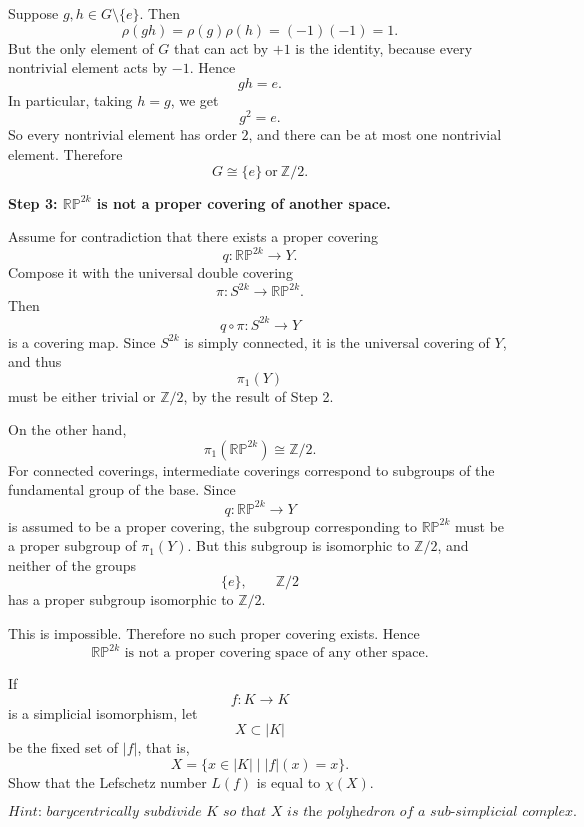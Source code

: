 \begin{solution}
Suppose \(g,h\in G\setminus\{e\}\). Then
\[
\rho(gh)=\rho(g)\rho(h)=(-1)(-1)=1.
\]
But the only element of \(G\) that can act by \(+1\) is the identity, because every nontrivial element acts by \(-1\). Hence
\[
gh=e.
\]
In particular, taking \(h=g\), we get
\[
g^2=e.
\]
So every nontrivial element has order \(2\), and there can be at most one nontrivial element. Therefore
\[
\boxed{G\cong \{e\}\ \text{or}\ \mathbb Z/2.}
\]

\par

\textbf{Step 3: \(\mathbb{RP}^{2k}\) is not a proper covering of another space.}

Assume for contradiction that there exists a proper covering
\[
q:\mathbb{RP}^{2k}\to Y.
\]
Compose it with the universal double covering
\[
\pi:S^{2k}\to \mathbb{RP}^{2k}.
\]
Then
\[
q\circ \pi:S^{2k}\to Y
\]
is a covering map. Since \(S^{2k}\) is simply connected, it is the universal covering of \(Y\), and thus
\[
\pi_1(Y)
\]
must be either trivial or \(\mathbb Z/2\), by the result of Step 2.

On the other hand,
\[
\pi_1(\mathbb{RP}^{2k})\cong \mathbb Z/2.
\]
For connected coverings, intermediate coverings correspond to subgroups of the fundamental group of the base. Since
\[
q:\mathbb{RP}^{2k}\to Y
\]
is assumed to be a proper covering, the subgroup corresponding to \(\mathbb{RP}^{2k}\) must be a proper subgroup of \(\pi_1(Y)\). But this subgroup is isomorphic to \(\mathbb Z/2\), and neither of the groups
\[
\{e\},\qquad \mathbb Z/2
\]
has a proper subgroup isomorphic to \(\mathbb Z/2\).

This is impossible. Therefore no such proper covering exists. Hence
\[
\boxed{\mathbb{RP}^{2k}\text{ is not a proper covering space of any other space.}}
\]
\end{solution}

\begin{problem}
If
\[
f:K\to K
\]
is a simplicial isomorphism, let
\[
X\subset |K|
\]
be the fixed set of \(|f|\), that is,
\[
X=\{x\in |K| \mid |f|(x)=x\}.
\]
Show that the Lefschetz number \(L(f)\) is equal to \(\chi(X)\).

\[
\textit{Hint: barycentrically subdivide \(K\) so that \(X\) is the polyhedron of a sub-simplicial complex.}
\]

\par
\end{problem}

